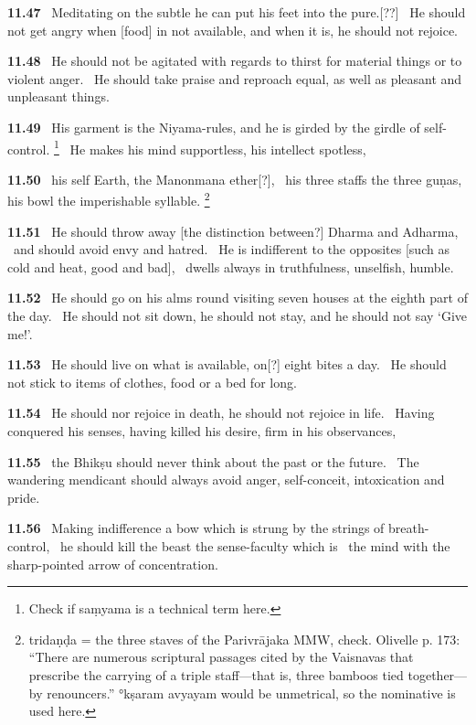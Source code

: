 \documentclass{article}
\begin{document}
\textbf{11.47}%
\ Meditating on the subtle he can put his feet into the pure.[??]%
\ He should not get angry when [food] in not available, and when it is, he should not rejoice.%


\textbf{11.48}%
\ He should not be agitated with regards to thirst for material things or to violent anger.%
\ He should take praise and reproach equal, as well as pleasant and unpleasant things.%


\textbf{11.49}%
\ His garment is the Niyama-rules, and he is girded by the girdle of self-control.%
\footnote{Check if saṃyama is a technical term here. }%
\ He makes his mind supportless, his intellect spotless,%


\textbf{11.50}%
\ his self Earth, the Manonmana ether[?],%
\ his three staffs the three guṇas, his bowl the imperishable syllable.%
\footnote{tridaṇḍa = the three staves of the Parivrājaka MMW, check.                 Olivelle p. 173: ``There are numerous scriptural passages cited                  by the Vaisnavas that prescribe the carrying of a triple staff---that is,                 three bamboos tied together---by renouncers.''              °kṣaram avyayam would be unmetrical, so the nominative is used here. }%


\textbf{11.51}%
\ He should throw away [the distinction between?] Dharma and Adharma,%
\                      and should avoid envy and hatred.%
\ He is indifferent to the opposites [such as cold and heat, good and bad],%
\                  dwells always in truthfulness, unselfish, humble.%


\textbf{11.52}%
\ He should go on his alms round visiting seven houses at the eighth part of the day.%
\ He should not sit down, he should not stay, and he should not say `Give me!'.%


\textbf{11.53}%
\ He should live on what is available, on[?] eight bites a day.%
\ He should not stick to items of clothes, food or a bed for long.%


\textbf{11.54}%
\ He should nor rejoice in death, he should not rejoice in life.%
\ Having conquered his senses, having killed his desire, firm in his observances,%


\textbf{11.55}%
\ the Bhikṣu should never think about the past or the future.%
\ The wandering mendicant should always avoid anger, self-conceit, intoxication and pride.%


\textbf{11.56}%
\ Making indifference a bow which is strung by the strings of breath-control,%
\ he should kill the beast the sense-faculty which is%
\                         the mind with the sharp-pointed arrow of concentration.%
\end{document}

